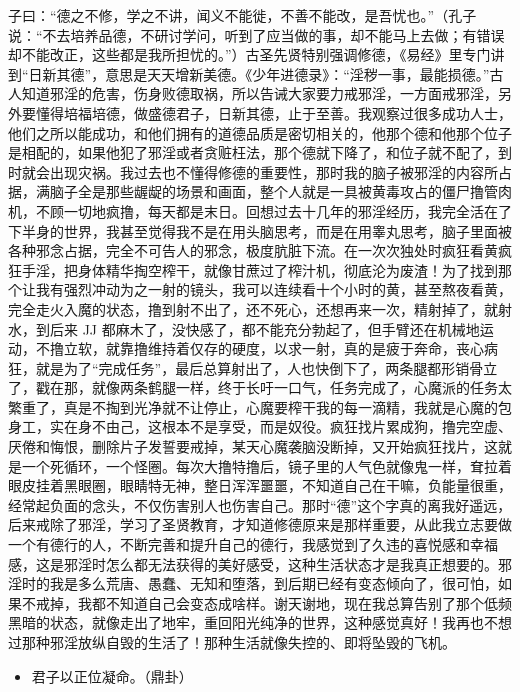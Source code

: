 子曰：“德之不修，学之不讲，闻义不能徙，不善不能改，是吾忧也。”（孔子说：“不去培养品德，不研讨学问，听到了应当做的事，却不能马上去做；有错误却不能改正，这些都是我所担忧的。”）古圣先贤特别强调修德，《易经》里专门讲到“日新其德”，意思是天天增新美德。《少年进德录》：“淫秽一事，最能损德。”古人知道邪淫的危害，伤身败德取祸，所以告诫大家要力戒邪淫，一方面戒邪淫，另外要懂得培福培德，做盛德君子，日新其德，止于至善。我观察过很多成功人士，他们之所以能成功，和他们拥有的道德品质是密切相关的，他那个德和他那个位子是相配的，如果他犯了邪淫或者贪赃枉法，那个德就下降了，和位子就不配了，到时就会出现灾祸。我过去也不懂得修德的重要性，那时我的脑子被邪淫的内容所占据，满脑子全是那些龌龊的场景和画面，整个人就是一具被黄毒攻占的僵尸撸管肉机，不顾一切地疯撸，每天都是末日。回想过去十几年的邪淫经历，我完全活在了下半身的世界，我甚至觉得我不是在用头脑思考，而是在用睾丸思考，脑子里面被各种邪念占据，完全不可告人的邪念，极度肮脏下流。在一次次独处时疯狂看黄疯狂手淫，把身体精华掏空榨干，就像甘蔗过了榨汁机，彻底沦为废渣！为了找到那个让我有强烈冲动为之一射的镜头，我可以连续看十个小时的黄，甚至熬夜看黄，完全走火入魔的状态，撸到射不出了，还不死心，还想再来一次，精射掉了，就射水，到后来 JJ 都麻木了，没快感了，都不能充分勃起了，但手臂还在机械地运动，不撸立软，就靠撸维持着仅存的硬度，以求一射，真的是疲于奔命，丧心病狂，就是为了“完成任务”，最后总算射出了，人也快倒下了，两条腿都形销骨立了，戳在那，就像两条鹤腿一样，终于长吁一口气，任务完成了，心魔派的任务太繁重了，真是不掏到光净就不让停止，心魔要榨干我的每一滴精，我就是心魔的包身工，实在身不由己，这根本不是享受，而是奴役。疯狂找片累成狗，撸完空虚、厌倦和悔恨，删除片子发誓要戒掉，某天心魔袭脑没断掉，又开始疯狂找片，这就是一个死循环，一个怪圈。每次大撸特撸后，镜子里的人气色就像鬼一样，耷拉着眼皮挂着黑眼圈，眼睛特无神，整日浑浑噩噩，不知道自己在干嘛，负能量很重，经常起负面的念头，不仅伤害别人也伤害自己。那时“德”这个字真的离我好遥远，后来戒除了邪淫，学习了圣贤教育，才知道修德原来是那样重要，从此我立志要做一个有德行的人，不断完善和提升自己的德行，我感觉到了久违的喜悦感和幸福感，这是邪淫时怎么都无法获得的美好感受，这种生活状态才是我真正想要的。邪淫时的我是多么荒唐、愚蠢、无知和堕落，到后期已经有变态倾向了，很可怕，如果不戒掉，我都不知道自己会变态成啥样。谢天谢地，现在我总算告别了那个低频黑暗的状态，就像走出了地牢，重回阳光纯净的世界，这种感觉真好！我再也不想过那种邪淫放纵自毁的生活了！那种生活就像失控的、即将坠毁的飞机。

\begin{itemize}\it
    \item 君子以正位凝命。（鼎卦）
\end{itemize}

